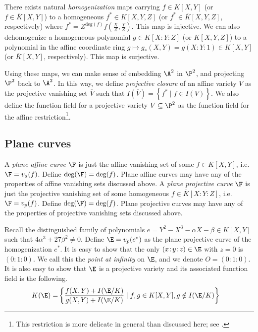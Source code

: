 \documentclass[11pt,letterpaper]{article}
\newcommand{\polys}{K[X,Y]}
\newcommand{\hpolys}{K[X\!:\!Y\!:\!Z]}
\theoremstyle{definition}
\newcommand{\6}{\mathbf}
\newcommand{\7}{\mathcal}
\begin{document}
There exists natural \textit{homogenization} maps carrying $f \in \polys$ (or $f \in \overline{K}[X,Y]$) to a homogeneous $f^* \in K[X,Y,Z]$ (or $f^* \in \overline{K}[X,Y,Z]$, respectively) where $f^* = Z^{\text{deg}(f)}f(\frac{X}{Z}, \frac{Y}{Z})$. This map is injective.
We can also dehomogenize a homogeneous polynomial $g \in \hpolys$ (or $\overline{K}[X,Y,Z]$) to a polynomial in the affine coordinate ring $g \mapsto g_*(X,Y) = g(X:Y:1) \in \polys$ (or $\overline{K}[X,Y]$, respectively). This map is surjective.

Using these maps, we can make sense of embedding $\A^2$ in $\P^2$, and projecting $\P^2$ back to $\A^2$.  In this way, we define \textit{projective closure} of an affine variety $V$ as the projective vanishing set $\overline{V}$ such that $I(\overline{V}) = \left\{f^* \mid f \in I(V)\right\}$. We also define the function field for a projective variety $V \subseteq \P^2$ as the function field for the affine restriction\footnote{This restriction is more delicate in general than discussed here; see \cite{Silverman}.}.


\subsection{Plane curves}
\label{sec:planecurve}

A \textit{plane affine curve} $\F$ is just the affine vanishing set of some $f \in \overline{K}[X,Y]$, i.e.\ $\F = v_a(f)$. Define $\text{deg}(\F) = \text{deg}(f)$. Plane affine curves may have any of the properties of affine vanishing sets discussed above. 
A \textit{plane projective curve} $\F$ is just the projective vanishing set of some homogeneous $f \in \overline{K}[X\!:\!Y\!:\!Z]$, i.e.\ $\F = v_p(f)$. Define $\text{deg}(\F) = \text{deg}(f)$. Plane projective curves may have any of the properties of projective vanishing sets discussed above. 

Recall the distinguished family of polynomials $e = Y^2 - X^3 - \alpha X - \beta \in K[X,Y]$ such that $4\alpha^3 + 27\beta^2 \neq 0$. Define $\E=v_p(e^*)$ as the plane projective curve of the homogenization $e^*$. It is easy to show that the only $(x\!:\!y\!:\!z) \in \E$ with $z=0$ is $(0\!:\!1\!:\!0)$.  We call this the \textit{point at infinity} on $\E$, and we denote $O = (0\!:\!1\!:\!0)$. It is also easy to show that $\E$ is a projective variety and its associated function field is the following.
\begin{align}
K(\E) =& \left\{\frac{f(X,Y) + I(\E/K)}{g(X,Y) + I(\E/K)} \mid f, g \in K[X,Y], g \notin I(\E/K)\right\}
\end{align}
\end{document}
